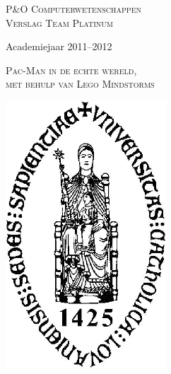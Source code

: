 
\begin{titlepage}

\fontsize{12pt}{14pt}\selectfont

\begin{center}

\vspace{1cm}

\fontsize{14pt}{17pt}\selectfont
\textsc{P\&O Computerwetenschappen\\
Verslag Team Platinum}
\fontsize{12pt}{14pt}\selectfont
\vspace{0.3cm}

\vspace{1.2cm}

Academiejaar 2011--2012

\vspace{2.8cm}

\fontsize{17.28pt}{21pt}\selectfont

{\textsc{Pac-Man in de echte wereld,\\ met behulp van Lego Mindstorms}}

\fontsize{12pt}{14pt}\selectfont

\vspace{2cm}

\includegraphics[height=10cm]{resources/Logo-Kul}

\end{center}
\end{titlepage}

\thispagestyle{empty}
